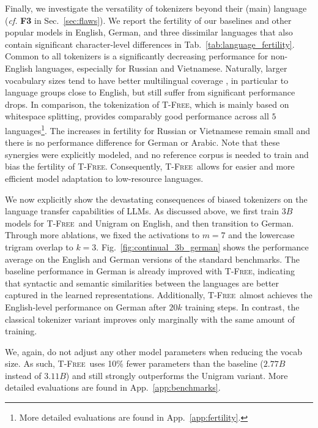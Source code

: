 \documentclass[11pt]{article}
\newcommand{\method}{\textsc{T-Free}}
\begin{document}
Finally, we investigate the versatility of tokenizers beyond their (main) language (\emph{cf.} \textbf{F3} in Sec.~\ref{sec:flaws}). We report the fertility of our baselines and other popular models in English, German, and three dissimilar languages that also contain significant character-level differences in Tab.~\ref{tab:language_fertility}. Common to all tokenizers is a significantly decreasing performance for non-English languages, especially for Russian and Vietnamese. Naturally, larger vocabulary sizes tend to have better multilingual coverage
, in particular to language groups close to English, but still suffer from significant performance drops. 
In comparison, the tokenization of \method, which is mainly based on whitespace splitting, provides comparably good performance across all $5$ languages\footnote{More detailed evaluations are found in App.~\ref{app:fertility}.}. The increases in fertility for Russian or Vietnamese remain small and there is no performance difference for German or Arabic. 
Note that these synergies were explicitly modeled, and no reference corpus is needed to train and bias the fertility of \method.
Consequently, \method~allows for easier and more efficient model adaptation to low-resource languages. 

We now explicitly show the devastating consequences of biased tokenizers on the language transfer capabilities of LLMs. 
As discussed above, we first train $3B$ models for \method~and Unigram on English, and then transition to German.
Through more ablations, we fixed the activations to $m=7$ and the lowercase trigram overlap to $k=3$.
Fig.~\ref{fig:continual_3b_german} shows the performance average on the English and German versions of the standard benchmarks.
The baseline performance in German is already improved with \method, indicating that syntactic and semantic similarities between the languages are better captured in the learned representations.
Additionally,  \method\ almost achieves the English-level performance on German after $20k$ training steps. In contrast, the classical tokenizer variant improves only marginally with the same amount of training.

We, again, do not adjust any other model parameters when reducing the vocab size. 
As such, \method~uses 10\% fewer parameters than the baseline ($2.77B$ instead of $3.11B$) and still strongly outperforms the Unigram variant. More detailed evaluations are found in App.~\ref{app:benchmarks}.
\end{document}
